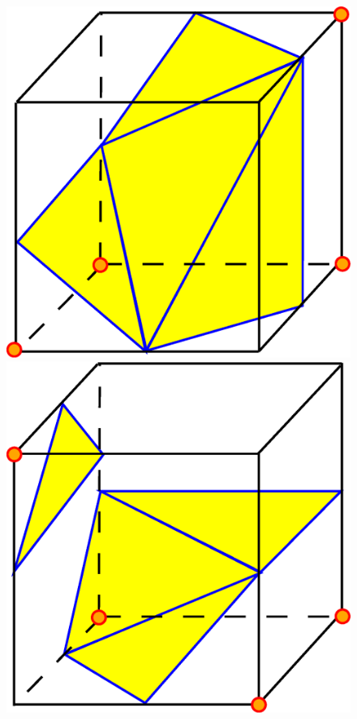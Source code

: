 \begin{figure}[ht]
\hspace{1mm}
\includegraphics[scale=0.15]{../img/mar_cub_case11.eps}
\hspace{2mm}
\includegraphics[scale=0.15]{../img/mar_cub_case12.eps}

\end{figure}
